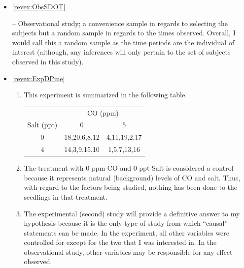 \documentclass[10pt,openany]{book}\usepackage[]{graphicx}\usepackage[]{color}
\begin{document}
\begin{itemize}
  \item \hypertarget{ans:ObsSDOT}{\ref{revex:ObsSDOT}} -- Observational study; a convenience sample in regards to selecting the subjects but a random sample in regards to the times observed.  Overall, I would call this a random sample as the time periods are the individual of interest (although, any inferences will only pertain to the set of subjects observed in this study).

  \item \hypertarget{ans:ExpDPine}{\ref{revex:ExpDPine}}
    \begin{enumerate}
      \item This experiment is summarized in the following table.

\begin{tabular}{cc|c|}
 & \multicolumn{2}{c}{CO (ppm)} \\
\cline{2-3}
\multicolumn{1}{c|}{Salt (ppt)} & 0 & 5 \\
\hline
\multicolumn{1}{c|}{0} & 18,20,6,8,12 & \multicolumn{1}{c|}{4,11,19,2,17} \\
\hline
\multicolumn{1}{c|}{4} & 14,3,9,15,10 &  \multicolumn{1}{c|}{1,5,7,13,16} \\
\cline{2-3}
\end{tabular}

      \item The treatment with 0 ppm CO and 0 ppt Salt is considered a control because it represents natural (background) levels of CO and salt.  Thus, with regard to the factors being studied, nothing has been done to the seedlings in that treatment.
      \item The experimental (second) study will provide a definitive answer to my hypothesis because it is the only type of study from which ``causal'' statements can be made.  In the experiment, all other variables were controlled for except for the two that I was interested in.  In the observational study, other variables may be responsible for any effect observed.
    \end{enumerate}

\end{itemize}




\end{document}
